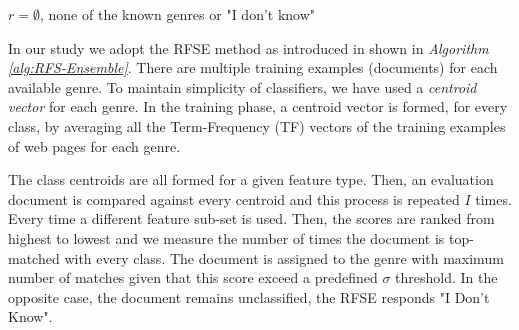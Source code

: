 \hfill \break

\begin{algorithm}[H]
\caption{The \textit{RFSE} algorithm.}\label{alg:RFS-Ensemble}

{
      $r = \emptyset$, none of the known genres or "I don't know"\;
}
\end{algorithm}

\hfill \break

In our study we adopt the RFSE method as introduced in \citep{pritsos2013open} shown in \textit{Algorithm \ref{alg:RFS-Ensemble}}. There are multiple training examples (documents) for each available genre. To maintain simplicity of classifiers, we have used a \textit{centroid vector} for each genre. In the training phase, a centroid vector is formed, for every class, by averaging all the Term-Frequency (TF) vectors of the training examples of web pages for each genre.

The class centroids are all formed for a given feature type. Then, an evaluation document is compared against every centroid and this process is repeated $I$ times. Every time a different feature sub-set is used. Then, the scores are ranked from highest to lowest and we measure the number of times the document is top-matched with every class. The document is assigned to the genre with maximum number of matches given that this score exceed a predefined $\sigma$ threshold. In the opposite case, the document remains unclassified, the RFSE responds "I Don't Know".


